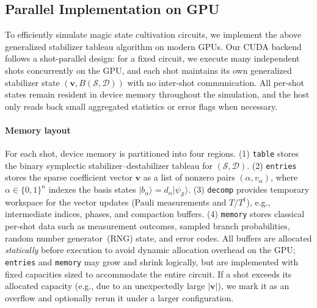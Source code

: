 \documentclass[10pt,conference]{IEEEtran}
\begin{document}
\subsection{Parallel Implementation on GPU}
\label{subsec:gpu_impl}

To efficiently simulate magic state cultivation circuits, we implement the above generalized stabilizer tableau algorithm on modern GPUs.
Our CUDA backend follows a shot-parallel design: for a fixed circuit, we execute many independent shots concurrently on the GPU, and each shot maintains its own generalized stabilizer state $(\mathbf{v},B(\mathcal{S},\mathcal{D}))$ with no inter-shot communication.
All per-shot states remain resident in device memory throughout the simulation, and the host only reads back small aggregated statistics or error flags when necessary.

\paragraph{Memory layout}
For each shot, device memory is partitioned into four regions.
(1) \texttt{table} stores the binary symplectic stabilizer--destabilizer tableau for $(\mathcal{S},\mathcal{D})$.
(2) \texttt{entries} stores the sparse coefficient vector $\mathbf{v}$ as a list of nonzero pairs $(\alpha, v_\alpha)$, where $\alpha\in\{0,1\}^n$ indexes the basis states $|b_\alpha\rangle=d_\alpha|\psi_{\mathcal{S}}\rangle$.
(3) \texttt{decomp} provides temporary workspace for the vector updates (Pauli measurements and $T/T^\dagger$), e.g., intermediate indices, phases, and compaction buffers.
(4) \texttt{memory} stores classical per-shot data such as measurement outcomes, sampled branch probabilities, random number generator~(RNG) state, and error codes.
All buffers are allocated \emph{statically} before execution to avoid dynamic allocation overhead on the GPU; \texttt{entries} and \texttt{memory} may grow and shrink logically, but are implemented with fixed capacities sized to accommodate the entire circuit.
If a shot exceeds its allocated capacity (e.g., due to an unexpectedly large $|\mathbf{v}|$), we mark it as an overflow and optionally rerun it under a larger configuration.
\end{document}
